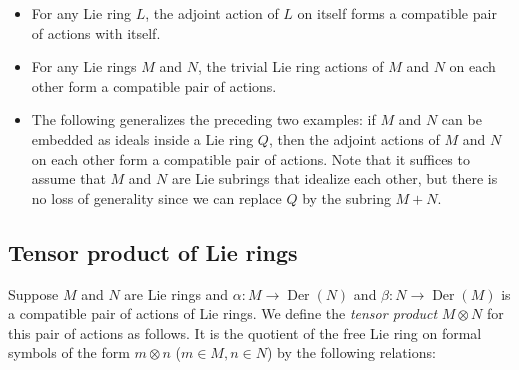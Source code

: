 \begin{itemize}
\item For any Lie ring $L$, the adjoint action of $L$ on itself forms
  a compatible pair of actions with itself.
\item For any Lie rings $M$ and $N$, the trivial Lie ring actions of
  $M$ and $N$ on each other form a compatible pair of actions.
\item The following generalizes the preceding two examples: if $M$ and
  $N$ can be embedded as ideals inside a Lie ring $Q$, then the
  adjoint actions of $M$ and $N$ on each other form a compatible pair
  of actions. Note that it suffices to assume that $M$ and $N$ are Lie
  subrings that idealize each other, but there is no loss of generality
  since we can replace $Q$ by the subring $M + N$.
\end{itemize}

\subsection{Tensor product of Lie rings}

Suppose $M$ and $N$ are Lie rings and $\alpha:M \to
\operatorname{Der}(N)$ and $\beta:N \to \operatorname{Der}(M)$ is a
compatible pair of actions of Lie rings. We define the {\em tensor
  product} $M \otimes N$ for this pair of actions as follows. It is
the quotient of the free Lie ring on formal symbols of the form $m
\otimes n$ ($m \in M, n \in N$) by the following relations:

